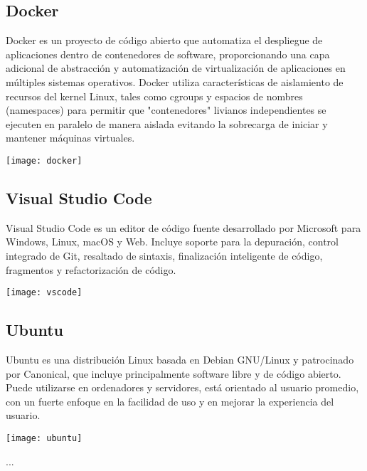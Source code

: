 \subsection{Docker}

Docker es un proyecto de código abierto que automatiza el despliegue de aplicaciones dentro de contenedores de software, proporcionando una capa adicional de abstracción y automatización de virtualización de aplicaciones en múltiples sistemas operativos.​ Docker utiliza características de aislamiento de recursos del kernel Linux, tales como cgroups y espacios de nombres (namespaces) para permitir que "contenedores" livianos independientes se ejecuten en paralelo de manera aislada evitando la sobrecarga de iniciar y mantener máquinas virtuales.

\texttt{[image: docker]}

\subsection{Visual Studio Code}

Visual Studio Code es un editor de código fuente desarrollado por Microsoft para Windows, Linux, macOS y Web. Incluye soporte para la depuración, control integrado de Git, resaltado de sintaxis, finalización inteligente de código, fragmentos y refactorización de código. 

\texttt{[image: vscode]}

\subsection{Ubuntu}
Ubuntu es una distribución Linux basada en Debian GNU/Linux y patrocinado por Canonical, que incluye principalmente software libre y de código abierto. Puede utilizarse en ordenadores y servidores, está orientado al usuario promedio, con un fuerte enfoque en la facilidad de uso y en mejorar la experiencia del usuario. 

\texttt{[image: ubuntu]}

...